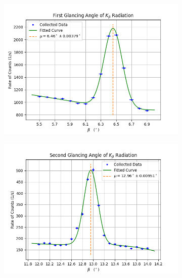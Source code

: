 \documentclass[twocolumn]{article}
\begin{document}
			\begin{figure}[h!]
				\begin{subfigure}{.33\textwidth}
					\begin{center}
						\includegraphics[width = \textwidth]{../Graphs/Peak 1}
					\end{center}
					\label{beta 1}
				\end{subfigure}
				\begin{subfigure}{.33\textwidth}
					\begin{center}
						\includegraphics[width = \textwidth]{../Graphs/Peak 3}
					\end{center}
					\label{beta 2}
				\end{subfigure}
				\begin{subfigure}{.33\textwidth}

\end{subfigure}
\end{figure}
\end{document}

